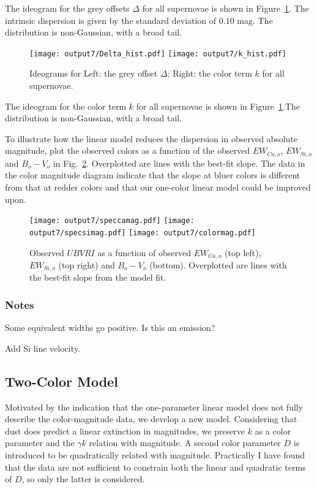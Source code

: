 \documentclass[11pt, oneside]{article}   	%
\begin{document}
The ideogram for the grey offsets $\Delta$ for all supernovae is shown in Figure~\ref{hist:fig}.  The intrinsic dispersion
is given by the standard deviation of $0.10$ mag.  The distribution is non-Gaussian, with a broad tail. 
\begin{figure}[htbp] %
   \centering
   \texttt{[image: output7/Delta\_hist.pdf]} 
   \texttt{[image: output7/k\_hist.pdf]} 
   \caption{Ideograms for Left: the grey offset $\Delta$; Right: the color term $k$ for all supernovae.}
   \label{hist:fig}
\end{figure}

The ideogram for the color term  $k$ for all supernovae is shown in Figure~\ref{hist:fig}.The distribution is non-Gaussian, with a broad tail. 

To illustrate how the linear model reduces the dispersion in observed absolute magnitude, plot the observed colors as a
function of the observed  $EW_{Ca, o}$, $EW_{Si,o}$ and $B_o-V_o$ in Fig.~\ref{magresidual:fig}.  Overplotted are lines with the
best-fit slope.  The data in the color magnitude diagram indicate that the slope at bluer colors is different from that at redder colors
and that our one-color linear model could be improved upon.

\begin{figure}[htbp] %
   \centering
   \texttt{[image: output7/speccamag.pdf]} 
      \texttt{[image: output7/specsimag.pdf]} 
   \texttt{[image: output7/colormag.pdf]} 
   \caption{Observed $UBVRI$ as a function of observed   $EW_{Ca, o}$ (top left), $EW_{Si,o}$ (top right) and $B_o-V_o$ (bottom).
   Overplotted are lines with the best-fit slope from the model fit.}
   \label{magresidual:fig}
\end{figure}

\subsubsection{Notes}
Some equivalent widths go positive.  Is this an emission?

Add Si line velocity.

\subsection{Two-Color Model}
Motivated by the indication that the one-parameter linear model does not fully describe the color-magnitude data, we develop a new model.
Considering that dust does predict a linear extinction in magnitudes, we preserve $k$ as a color parameter and the $\gamma k$ relation
with magnitude.   A second color parameter $D$ is introduced to be quadratically related with magnitude.  Practically I have found
that the data are not sufficient to constrain both the linear and quadratic terms of $D$, so only the latter is considered.
\end{document}
